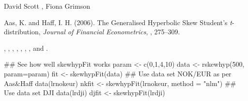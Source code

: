 \begin{Author}\relax
David Scott , Fiona Grimson
\end{Author}
\begin{References}\relax
Aas, K. and Haff, I. H. (2006).
The Generalised Hyperbolic Skew Student's \emph{t}-distribution,
\emph{Journal of Financial Econometrics}, , 275--309.
\end{References}
\begin{SeeAlso}\relax
{}, , ,
, ,
, ,
 and .
\end{SeeAlso}
\begin{Examples}
\begin{ExampleCode}
## See how well skewhypFit works
param <- c(0,1,4,10)
data <- rskewhyp(500, param=param)
fit <- skewhypFit(data)
## Use data set NOK/EUR as per Aas&Haff
data(lrnokeur)
nkfit <- skewhypFit(lrnokeur, method = "nlm")
## Use data set DJI
data(lrdji)
djfit <- skewhypFit(lrdji)
\end{ExampleCode}
\end{Examples}

